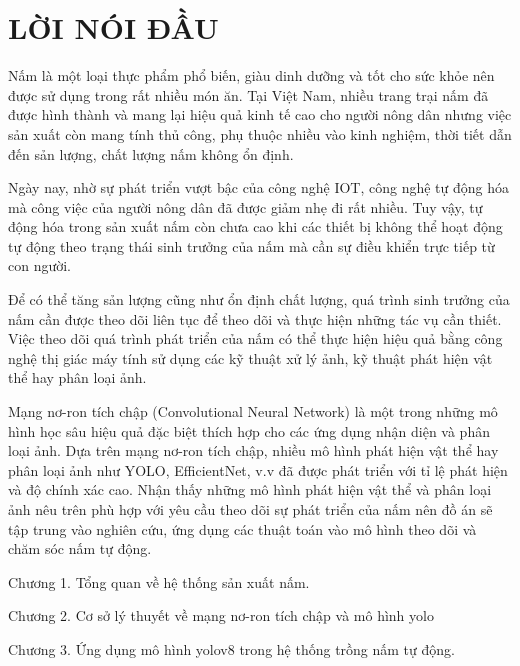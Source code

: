 
\chapter*{\hfill LỜI NÓI ĐẦU \hfill}
{}

Nấm là một loại thực phẩm phổ biến, giàu dinh dưỡng và tốt cho sức khỏe nên được sử dụng trong rất nhiều món ăn. Tại Việt Nam, nhiều trang trại nấm đã được hình thành và mang lại hiệu quả kinh tế cao cho người nông dân nhưng việc sản xuất còn mang tính thủ công, phụ thuộc nhiều vào kinh nghiệm, thời tiết dẫn đến sản lượng, chất lượng nấm không ổn định.

Ngày nay, nhờ sự phát triển vượt bậc của công nghệ IOT, công nghệ tự động hóa mà công việc của người nông dân đã được giảm nhẹ đi rất nhiều. Tuy vậy, tự động hóa trong sản xuất nấm còn chưa cao khi các thiết bị không thể hoạt động tự động theo trạng thái sinh trưởng của nấm mà cần sự điều khiển trực tiếp từ con người.

Để có thể tăng sản lượng cũng như ổn định chất lượng, quá trình sinh trưởng của nấm cần được theo dõi liên tục để theo dõi và thực hiện những tác vụ cần thiết. Việc theo dõi quá trình phát triển của nấm có thể thực hiện hiệu quả bằng công nghệ thị giác máy tính sử dụng các kỹ thuật xử lý ảnh, kỹ thuật phát hiện vật thể hay phân loại ảnh.

Mạng nơ-ron tích chập (Convolutional Neural Network) là một trong những mô hình học sâu hiệu quả đặc biệt thích hợp cho các ứng dụng nhận diện và phân loại ảnh. Dựa trên mạng nơ-ron tích chập, nhiều mô hình phát hiện vật thể hay phân loại ảnh như YOLO, EfficientNet, v.v đã được phát triển với tỉ lệ phát hiện và độ chính xác cao. Nhận thấy những mô hình phát hiện vật thể và phân loại ảnh nêu trên phù hợp với yêu cầu theo dõi sự phát triển của nấm nên đồ án sẽ tập trung vào nghiên cứu, ứng dụng các thuật toán vào mô hình theo dõi và chăm sóc nấm tự động.

\hspace{1cm}Chương 1. Tổng quan về hệ thống sản xuất nấm.

\hspace{1cm}Chương 2. Cơ sở lý thuyết về mạng nơ-ron tích chập và mô hình yolo

\hspace{1cm}Chương 3. Ứng dụng mô hình yolov8 trong hệ thống trồng nấm tự động.


